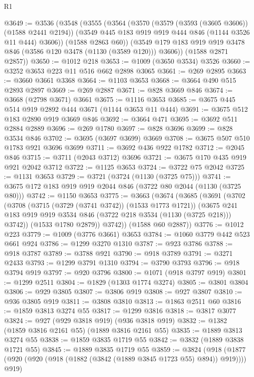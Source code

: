 \begin{lexlean}{R1}
\begin{coremodule}
@3649 := @3536
    (@3548
      (@3555
        (@3564
          (@3570
            (@3579 (@3593 (@3605 @3606)) (@1588 @2441 @2194))
            (@3549 @445 @183 @919 @919 @444 @846 (@1144 @3526 @11 @444) @3606))
          (@1588 @2863 @60))
        (@3549 @179 @183 @919 @919 @3478 @846 (@3586 @120 @3478 (@1130 (@3589 @120))) @3606))
      (@1588 @2871 @2857))
@3650 := @1012 @218
@3653 := @1009 (@3650 @3534) @3526
@3660 := @3252 @3653 @223 @11 @516 @662 @2898 @3065
@3661 := @269 @2895
@3663 := @3660 @3661 @3368
@3664 := @1103 @3653
@3668 := @3664 @490 @515 @2893 @2897
@3669 := @269 @2887
@3671 := @828 @3669 @846
@3674 := @3668 (@2798 @3671) @3661
@3675 := @1116 @3653
@3685 := @3675 @445 @514 @919 @2892 @444 @3671 (@1144 @3653 @11 @444)
@3691 := @3675 @512 @183 @2890 @919 @3669 @846
@3692 := @3664 @471
@3695 := @3692 @511 @2884 @2889
@3696 := @269 @1780
@3697 := @828 @3696
@3699 := @828 @3534 @846
@3702 := @3695 (@3697 @3699) @3669
@3708 := @3675 @507 @510 @1783 @921 @3696 @3699
@3711 := @3692 @436 @922 @1782
@3712 := @2045 @846
@3715 := @3711 (@2043 @3712) @3696
@3721 := @3675 @170 @435 @919 @921 @2042 @3712
@3722 := @1125 @3653
@3724 := @3722 @75 @2042
@3725 := @1131 @3653
@3729 := @3721 (@3724 (@1130 (@3725 @75)))
@3741 := @3675 @172 @183 @919 @919 @2044 @846 (@3722 @80 @2044 (@1130 (@3725 @80)))
@3742 := @1150 @3653
@3775 := @3663
    (@3674
      (@3685
        (@3691
          (@3702
            (@3708
              (@3715 (@3729 (@3741 @3742)) (@1533 @1773 @1721))
              (@3675 @241 @183 @919 @919 @3534 @846 (@3722 @218 @3534 (@1130 (@3725 @218))) @3742))
            (@1533 @1780 @2879))
          @3742))
      (@1588 @60 @2887))
@3776 := @1012 @223
@3779 := @1009 (@3776 @3661) @3653
@3784 := @1060 @3779 @442 @523 @661 @924
@3786 := @1299 @3270 @1310
@3787 := @923 @3786
@3788 := @918 @3787
@3789 := @3788 @921
@3790 := @918 @3789
@3791 := @3271 @2433
@3793 := @1299 @3791 @1310
@3794 := @3790 @3793
@3796 := @918 @3794 @919
@3797 := @920 @3796
@3800 := @1071 (@918 @3797 @919)
@3801 := @1299 @2511
@3804 := @1829 (@1303 @1774 @3274)
@3805 := @3801 @3804
@3806 := @929 @3805
@3807 := @3806 @919
@3808 := @927 @3807
@3810 := @936 @3805 @919
@3811 := @3808 @3810
@3813 := @1863 @2511 @60
@3816 := @1859 @3813 @3274 @55
@3817 := @1299 @3816
@3818 := @3817 @3077
@3824 := @927 (@929 @3818 @919) (@936 @3818 @919)
@3832 := @1382 (@1859 @3816 @2161 @55) (@1889 @3816 @2161 @55)
@3835 := @1889 @3813 @3274 @55
@3838 := @1859 @3835 @1719 @55
@3842 := @3832 (@1889 @3838 @1721 @55)
@3845 := @1889 @3835 @1719 @55
@3859 := @3824
    (@918 (@1877 (@920 (@920 (@918 (@1882 (@3842 (@1889 @3845 @1723 @55) @894)) @919)))) @919)

\end{coremodule}
\end{lexlean}
